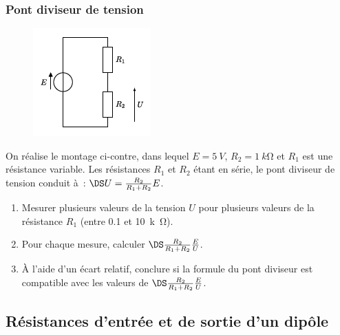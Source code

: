 \documentclass[../main/main.tex]{subfiles}
\begin{document}
\subsubsection{Pont diviseur de tension}
\begin{figure}
	\centering
	\includegraphics[width=\linewidth]{pontdiv}
\end{figure}

On réalise le montage ci-contre, dans lequel $E = \SI{5}{V}$, $R_2 =
	\SI{1}{k\ohm}$ et $R_1$ est une résistance variable. Les résistances $R_1$ et
$R_2$ étant en série, le pont diviseur de tension conduit à~: $\DS U =
	\frac{R_2}{R_1+R_2}E$.

\begin{enumerate}[start=4, label=\sqenumi]
	\item Mesurer plusieurs valeurs de la tension $U$ pour plusieurs valeurs de
	      la résistance $R_1$ (entre \num{0.1} et \SI{10}{k\ohm}).
	\item Pour chaque mesure, calculer $\DS \frac{R_2}{R_1+R_2} \frac{E}{U}$.
	\item À l'aide d'un écart relatif, conclure si la formule du pont diviseur est
	      compatible avec les valeurs de $\DS \frac{R_2}{R_1+R_2} \frac{E}{U}$.
\end{enumerate}

\subsection{Résistances d'entrée et de sortie d'un dipôle}
\end{document}
